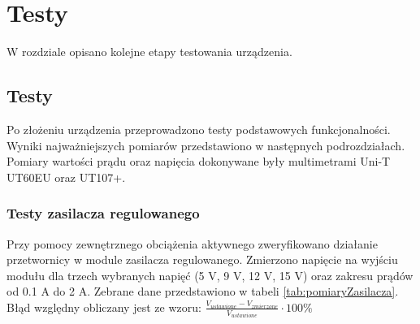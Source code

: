 \chapter{Testy}
\label{chapter-5}

\vspace{0.5cm}

W rozdziale opisano kolejne etapy testowania urządzenia.

\FloatBarrier
\section{Testy}

Po złożeniu urządzenia przeprowadzono testy podstawowych funkcjonalności. Wyniki najważniejszych pomiarów przedstawiono 
w następnych podrozdziałach. Pomiary wartości prądu oraz napięcia dokonywane były multimetrami Uni-T UT60EU oraz UT107+.

\FloatBarrier
\subsection{Testy zasilacza regulowanego}

Przy pomocy zewnętrznego obciążenia aktywnego zweryfikowano działanie przetwornicy w module zasilacza regulowanego.
Zmierzono napięcie na wyjściu modułu dla trzech wybranych napięć (5 V, 9 V, 12 V, 15 V) oraz zakresu prądów od 0.1 A do 2 A. 
Zebrane dane przedstawiono w tabeli \ref{tab:pomiaryZasilacza}. Błąd względny obliczany jest ze wzoru: 
$\frac{V_{ustawione} - V_{zmierzone}}{V_{ustawione}} \cdot 100 \%$


